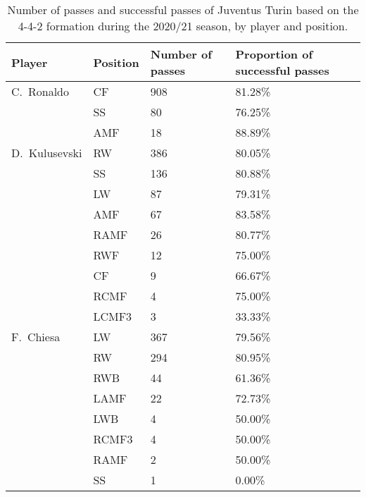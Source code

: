 \begin{table}[!htbp]
\small
\centering
\caption{Number of passes and successful passes of Juventus Turin based on the 4-4-2 formation during the 2020/21 season, by player and position.}\s 

\label{app:juventus_famous}
\begin{tabular}{@{}llll@{}}
\toprule
Player       & Position & Number of passes & Proportion of successful passes \\ \midrule
C.\ Ronaldo & CF              & 908              & 81.28\%         \\
 & SS              & 80               & 76.25\%         \\
 & AMF             & 18               & 88.89\%         \\
D.\ Kulusevski     & RW              & 386              & 80.05\%         \\
     & SS              & 136              & 80.88\%         \\
     & LW              & 87               & 79.31\%         \\
     & AMF             & 67               & 83.58\%         \\
     & RAMF            & 26               & 80.77\%         \\
     & RWF             & 12               & 75.00\%         \\
     & CF              & 9                & 66.67\%         \\
     & RCMF            & 4                & 75.00\%         \\
     & LCMF3           & 3                & 33.33\%         \\
F.\ Chiesa         & LW              & 367              & 79.56\%         \\
         & RW              & 294              & 80.95\%         \\
         & RWB             & 44               & 61.36\%         \\
         & LAMF            & 22               & 72.73\%         \\
         & LWB             & 4                & 50.00\%         \\
         & RCMF3           & 4                & 50.00\%         \\
         & RAMF            & 2                & 50.00\%         \\
         & SS              & 1                & 0.00\%          \\

\end{tabular}
\end{table}
